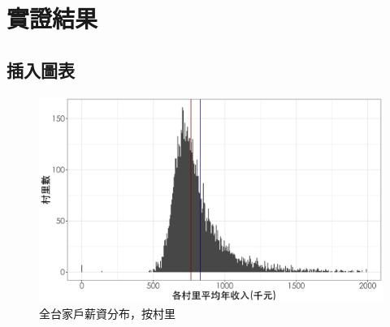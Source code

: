 
\chapter{實證結果}

\section{插入圖表}



\begin{figure}[!htbp]
\centering
\caption{全台家戶薪資分布，按村里}
\label{fig:income}
\includegraphics[width = \textwidth]{contents/figures/township_income.png}
\end{figure}

